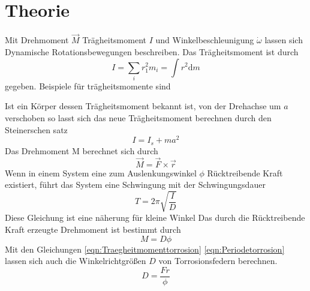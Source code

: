 

\section{Theorie}
\label{sec:Theorie}
Mit Drehmoment $\vec{M}$ Trägheitsmoment $I$ und Winkelbeschleunigung $\dot{\omega}$
lassen sich Dynamische Rotationsbewegungen beschreiben. Das Trägheitsmoment ist
durch
\begin{equation}
  I=\sum_i r_1^2m_i=\int r^2 \text{d}m
\end{equation}
gegeben.
Beispiele für trägheitsmomente sind
\begin{figure}
\end{figure}
Ist ein Körper dessen Trägheitsmoment bekannt ist, von der Drehachse um
$a$ verschoben so lasst sich das neue Trägheitsmoment berechnen durch den
Steinerschen satz
\begin{equation}
  I=I_s+m a^2
\end{equation}
Das Drehmoment M berechnet sich durch
\begin{equation}
  \vec{M}=\vec{F}\times\vec{r}
\end{equation} 
Wenn in einem System eine zum Auslenkungswinkel $\phi$ Rücktreibende Kraft
existiert, führt das System eine Schwingung mit der Schwingungsdauer
\begin{equation}
  T=2\pi\sqrt{\frac{I}{D}}
  \label{eqn:Periodetorrosion}
\end{equation}
Diese Gleichung ist eine näherung für kleine Winkel
Das durch die Rücktreibende Kraft erzeugte Drehmoment ist bestimmt durch
\begin{equation}
  M=D \phi
  \label{eqn:Traegheitmomenttorrosion}
\end{equation}
Mit den Gleichungen \eqref{eqn:Traegheitmomenttorrosion} \eqref{eqn:Periodetorrosion}
lassen sich auch die Winkelrichtgrößen $D$ von Torrosionsfedern
berechnen.
\begin{equation}
  D=\frac{Fr}{\phi}
  \label{eqn:Winkelrichtgroesse}
\end{equation}
  \cite{sample}
